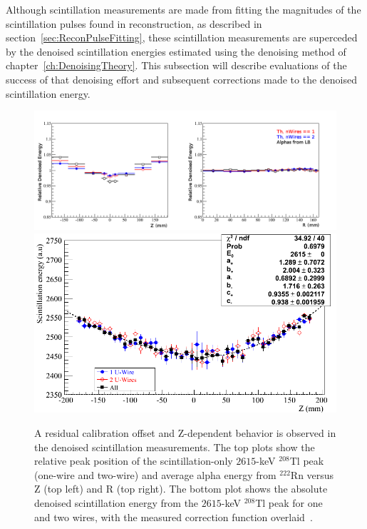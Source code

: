 Although scintillation measurements are made from fitting the magnitudes of the scintillation pulses found in reconstruction, as described in section~\ref{sec:ReconPulseFitting}, these scintillation measurements are superceded by the denoised scintillation energies estimated using the denoising method of chapter~\ref{ch:DenoisingTheory}.  This subsection will describe evaluations of the success of that denoising effort and subsequent corrections made to the denoised scintillation energy.

\begin{figure}
\begin{center}
\includegraphics[keepaspectratio=true,width=\textwidth]{DenoisedScintillatonRelativeRZBias.png}
\includegraphics[keepaspectratio=true,width=\textwidth]{DenoisedScintillatonZBias.png}
\end{center}
\renewcommand{\baselinestretch}{1}
\small\normalsize
\begin{quote}
\caption{A residual calibration offset and Z-dependent behavior is observed in the denoised scintillation measurements.  The top plots show the relative peak position of the scintillation-only $2615$-keV $^{208}$Tl peak (one-wire and two-wire) and average alpha energy from $^{222}$Rn versus Z (top left) and R (top right).  The bottom plot shows the absolute denoised scintillation energy from the $2615$-keV $^{208}$Tl peak for one and two wires, with the measured correction function overlaid~\cite{EnergyDocumentRun2ab}.}
\label{fig:ResidualLightZBias}
\end{quote}
\end{figure}
\renewcommand{\baselinestretch}{2}
\small\normalsize

